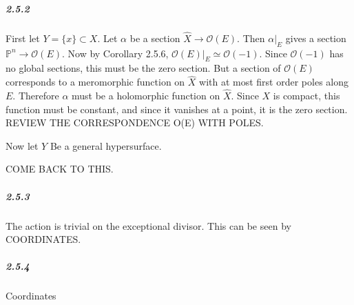 \documentclass[10pt,letter]{article}
\begin{document}
\subparagraph{2.5.2} First let $Y = \lbrace x \rbrace \subset X$. Let $\alpha$ be a section $\hat{X} \rightarrow \mathcal{O}(E)$. Then $\alpha \vert_E$ gives a section $\mathbb{P}^n \rightarrow \mathcal{O}(E)$. Now by Corollary 2.5.6, $\mathcal{O}(E) \vert_E \simeq \mathcal{O}(-1)$. Since $\mathcal{O}(-1)$ has no global sections, this must be the zero section.  But a section of $\mathcal{O}(E)$ corresponds to a meromorphic function on $\hat{X}$ with at most first order poles along $E$. Therefore $\alpha$ must be a holomorphic function on $\hat{X}$. Since $X$ is compact, this function must be constant, and since it vanishes at a point, it is the zero section. REVIEW THE CORRESPONDENCE O(E) WITH POLES. 

Now let $Y$ Be a general hypersurface. 

COME BACK TO THIS.

\subparagraph{2.5.3} The action is trivial on the exceptional divisor. This can be seen by  COORDINATES. 

\subparagraph{2.5.4} Coordinates 
\end{document}
